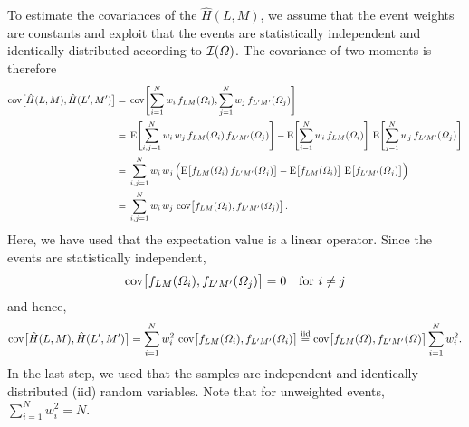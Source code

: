 To estimate the covariances of the $\hat{H}(L, M)$, we assume that the
event weights are constants and exploit that the events are
statistically independent and identically distributed according to
$\mathcal{I}(\Omega)$.  The covariance of two moments is therefore
\begin{align}
  \cov[1]{\hat{H}(L, M), \hat{H}(L', M')}
  ={}& \cov[4]{\sum_{i = 1}^N w_i\, f_{L M}(\Omega_i), \sum_{j = 1}^N w_j\, f_{L' M'}(\Omega_j)} \nonumber
  \\
  ={}& \exptVal[4]{\sum_{i, j = 1}^N w_i\, w_j\, f_{L M}(\Omega_i)\, f_{L' M'}(\Omega_j)}
     - \exptVal[4]{\sum_{i = 1}^N w_i\, f_{L M}(\Omega_i)}\, \exptVal[4]{\sum_{j = 1}^N w_j\, f_{L' M'}(\Omega_j)} \nonumber
  \\
  ={}& \sum_{i, j = 1}^N w_i\, w_j \rBrk[2]{\exptVal[1]{f_{L M}(\Omega_i)\, f_{L' M'}(\Omega_j)}
                                       - \exptVal[1]{f_{L M}(\Omega_i)}\, \exptVal[1]{f_{L' M'}(\Omega_j)}} \nonumber
  \\
  ={}& \sum_{i, j = 1}^N w_i\, w_j\, \cov[1]{f_{L M}(\Omega_i), f_{L' M'}(\Omega_j)}.
\end{align}
Here, we have used that the expectation value is a linear operator.
Since the events are statistically independent,
\begin{equation}
  \cov[1]{f_{L M}(\Omega_i), f_{L' M'}(\Omega_j)}
  = 0
  \quad\text{for $i \neq j$}
\end{equation}
and hence,
\begin{equation}
  \label{eq:diffraction_moments_cov}
  \cov[1]{\hat{H}(L, M), \hat{H}(L', M')}
  = \sum_{i = 1}^N w_i^2\, \cov[1]{f_{L M}(\Omega_i), f_{L' M'}(\Omega_i)}
  \equalUsing{\text{iid}} \cov[1]{f_{L M}(\Omega), f_{L' M'}(\Omega)} \sum_{i = 1}^N w_i^2.
\end{equation}
In the last step, we used that the samples are independent and
identically distributed (iid) random variables.  Note that for
unweighted events, $\sum_{i = 1}^N w_i^2 = N$.

